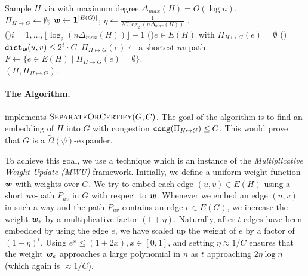 \begin{algorithm}
\DontPrintSemicolon
Sample $H$ via  with maximum degree $\Delta_{max}(H) = O(\log n)$.\\
$\Pi_{H \mapsto G} \gets \emptyset$; $\boldsymbol{\mathit{w}} \gets \mathbf{1}^{|E(G)|}$; $\eta \gets  \frac{1}{ 2 C \log_2(n\Delta_{max}(H))}$ .\label{lne:init}\\
\For(\label{lne:forLoop}){$i = 1, \ldots, \lfloor \log_2(n\Delta_{max}(H)) \rfloor +1$}{
    \ForEach(\label{lne:foreachUnrouted}){$e \in E(H)$ with $\Pi_{H \mapsto G}(e) = \emptyset$}{
        \If(\label{lne:ifReallyEmbed}){$\operatorname{\mathtt{dist}}_{\boldsymbol{\mathit{w}}}(u,v) \leq 2^{i} \cdot C$}{
            $\Pi_{H \mapsto G}(e) \gets \text{a shortest } uv\text{-path}$. \\
        }
    }
   $F \gets  \{ e \in  E(H) \;|\; \Pi_{H \mapsto G}(e) = \emptyset\}$.\\
}
\Return $(H, \Pi_{H \mapsto G})$. \label{lne:terminateEmbed}
\caption{$\textsc{SeparateOrCertify}(G, C)$}\label{alg:embedOrSep}
\end{algorithm}

\paragraph{The Algorithm.}  implements $\textsc{SeparateOrCertify}(G, C)$. The goal of the algorithm is to find an embedding of $H$ into $G$ with congestion $\operatorname{\mathtt{cong}}(\Pi_{H \mapsto G}) \leq C$.  This would prove that $G$ is a $\tilde{\Omega}(\psi)$-expander.

To achieve this goal, we use a technique which is an instance of the \emph{Multiplicative Weight Update (MWU)} framework. Initially, we define a uniform weight function $\boldsymbol{\mathit{w}}$ with weights over $G$. We try to embed each edge $(u,v) \in E(H)$ using a short $uv$-path $P_{uv}$ in $G$ with respect to $\boldsymbol{\mathit{w}}$. Whenever we embed an edge $(u,v)$ in such a way and the path $P_{uv}$ contains an edge $e \in E(G)$, we increase the weight $\boldsymbol{\mathit{w}}_e$ by a multiplicative factor $(1+\eta)$. Naturally, after $t$ edges have been embedded by using the edge $e$, we have scaled up the weight of $e$ by a factor of $(1+\eta)^t$. Using $e^x \le (1 + 2x), x \in [0, 1]$, and setting $\eta \approx 1/C$ ensures that the weight $\boldsymbol{\mathit{w}}_e$ approaches a large polynomial in $n$ as $t$ approaching $2\eta \log n$ (which again is $\approx 1/C$). 

